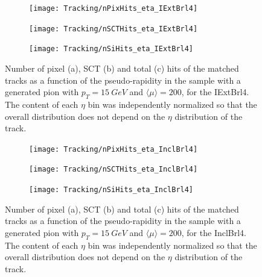 \documentclass[a4paper,twoside,12pt]{book}
\begin{document}
\begin{figure}
\begin{subfigure}{\linewidth}
\centering
\texttt{[image: Tracking/nPixHits\_eta\_IExtBrl4]}
\caption{}
\label{fig:tracking:nPixHits_eta_IExtBrl4}
\end{subfigure}

\begin{subfigure}{\linewidth}
\centering
\texttt{[image: Tracking/nSCTHits\_eta\_IExtBrl4]}
\caption{}
\label{fig:tracking:nSCTHits_eta_IExtBrl4}
\end{subfigure}

\begin{subfigure}{\linewidth}
\centering
\texttt{[image: Tracking/nSiHits\_eta\_IExtBrl4]}
\caption{}
\label{fig:tracking:nSiHits_eta_IExtBrl4}
\end{subfigure}
\caption{Number of pixel (a), SCT (b) and total (c) hits of the matched tracks as a function of the pseudo-rapidity in the sample with a generated pion with $p_{T} = 15\ GeV$ and $\langle\mu\rangle = 200$, for the IExtBrl4. The content of each $\eta$ bin was independently normalized so that the overall distribution does not depend on the $\eta$ distribution of the track.}
\label{fig:tracking:nHits_eta_IExtBrl4}
\end{figure}

\begin{figure}
\begin{subfigure}{\linewidth}
\centering
\texttt{[image: Tracking/nPixHits\_eta\_InclBrl4]}
\caption{}
\label{fig:tracking:nPixHits_eta_InclBrl4}
\end{subfigure}

\begin{subfigure}{\linewidth}
\centering
\texttt{[image: Tracking/nSCTHits\_eta\_InclBrl4]}
\caption{}
\label{fig:tracking:nSCTHits_eta_InclBrl4}
\end{subfigure}

\begin{subfigure}{\linewidth}
\centering
\texttt{[image: Tracking/nSiHits\_eta\_InclBrl4]}
\caption{}
\label{fig:tracking:nSiHits_eta_InclBrl4}
\end{subfigure}
\caption{Number of pixel (a), SCT (b) and total (c) hits of the matched tracks as a function of the pseudo-rapidity in the sample with a generated pion with $p_{T} = 15\ GeV$ and $\langle\mu\rangle = 200$, for the InclBrl4. The content of each $\eta$ bin was independently normalized so that the overall distribution does not depend on the $\eta$ distribution of the track.}
\label{fig:tracking:nHits_eta_InclBrl4}
\end{figure}
\end{document}
